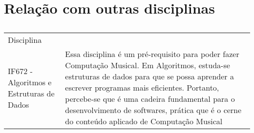 \documentclass{article}
\begin{document}
\section{Relação com outras disciplinas}

\begin{table}[h]
 \centering
 {\renewcommand\arraystretch{1.25}
 \caption{ }
 \begin{tabular}{ l l }
  \cline{1-1}\cline{2-2}  
    \multicolumn{2}{|p{4.050cm}|}{Disciplina \centering }
  \\  
  \cline{1-1}\cline{2-2}  
    \multicolumn{1}{|p{4.050cm}|}{IF672 - Algoritmos e Estruturas de Dados} &
    \multicolumn{1}{p{4.050cm}|}{Essa disciplina é um pré-requisito para poder fazer Computação Musical. Em Algoritmos, estuda-se estruturas de dados para que se possa aprender a escrever programas mais eficientes. Portanto, percebe-se que é uma cadeira fundamental para o desenvolvimento de softwares, prática que é o cerne do conteúdo aplicado de Computação Musical}
  \\  
  \hline

 \end{tabular} }
\end{table}







\end{document}
